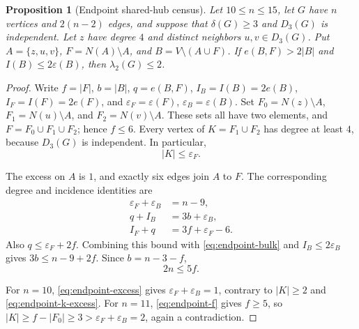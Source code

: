 \documentclass[11pt]{article}
\numberwithin{equation}{section}
\newtheorem{proposition}[theorem]{Proposition}
\theoremstyle{definition}
\theoremstyle{remark}
\newcommand{\ac}{\lambda_2}
\begin{document}
\begin{proposition}[Endpoint shared-hub census]
\label{prop:endpoint-shared-hub}
Let \(10\le n\le15\), let \(G\) have \(n\) vertices and \(2(n-2)\)
edges, and suppose that \(\delta(G)\ge3\) and \(D_3(G)\) is independent.
Let \(z\) have degree \(4\) and distinct neighbors \(u,v\in D_3(G)\).
Put \(A=\{z,u,v\}\), \(F=N(A)\setminus A\), and
\(B=V\setminus(A\cup F)\).
If \(e(B,F)>2|B|\) and \(I(B)\le2\varepsilon(B)\), then \(\ac(G)\le2\).
\end{proposition}

\begin{proof}
Write \(f=|F|\), \(b=|B|\), \(q=e(B,F)\),
\(I_B=I(B)=2e(B)\), \(I_F=I(F)=2e(F)\), and
\(\varepsilon_F=\varepsilon(F)\), \(\varepsilon_B=\varepsilon(B)\).  Set
\(F_0=N(z)\setminus A\), \(F_1=N(u)\setminus A\), and
\(F_2=N(v)\setminus A\).  These sets all have two elements, and
\(F=F_0\cup F_1\cup F_2\); hence
\(f\le6\).  Every vertex of \(K=F_1\cup F_2\) has degree at least
\(4\), because \(D_3(G)\) is independent.  In particular,
\begin{equation}\label{eq:endpoint-k-excess}
  |K|\le \varepsilon_F.
\end{equation}

The excess on \(A\) is \(1\), and exactly six edges join \(A\) to \(F\).
The corresponding degree and incidence identities are
\begin{align}
 \varepsilon_F+\varepsilon_B&=n-9,                 \label{eq:endpoint-excess}\\
 q+I_B&=3b+\varepsilon_B,                           \label{eq:endpoint-bulk}\\
 I_F+q&=3f+\varepsilon_F-6.                         \label{eq:endpoint-moat}
\end{align}
Also \(q\le \varepsilon_F+2f\).  Combining this bound with
\eqref{eq:endpoint-bulk} and \(I_B\le2\varepsilon_B\) gives
\(3b\le n-9+2f\).  Since \(b=n-3-f\),
\begin{equation}\label{eq:endpoint-f}
  2n\le5f.
\end{equation}

For \(n=10\), \eqref{eq:endpoint-excess} gives
\(\varepsilon_F+\varepsilon_B=1\), contrary to \(|K|\ge2\) and
\eqref{eq:endpoint-k-excess}.  For \(n=11\),
\eqref{eq:endpoint-f} gives \(f\ge5\), so
\(|K|\ge f-|F_0|\ge3>\varepsilon_F+\varepsilon_B=2\), again a contradiction.


\end{proof}
\end{document}
